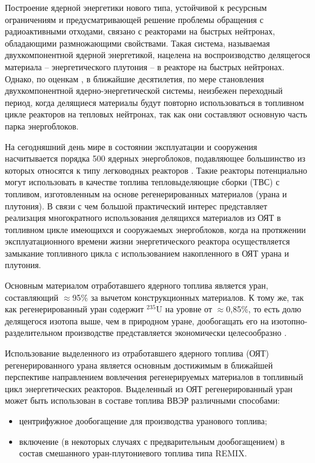 {\actuality}
Построение ядерной энергетики нового типа, устойчивой к ресурсным ограничениям и предусматривающей решение проблемы обращения с радиоактивными отходами, связано с реакторами на быстрых нейтронах, обладающими размножающими свойствами. Такая система, называемая двухкомпонентной ядерной энергетикой, нацелена на воспроизводство делящегося материала -- энергетического  плутония -- в реакторе на быстрых нейтронах. Однако, по оценкам \cite{andrianovaPerspektivnyeToplivnyeZagruzki2015}, в ближайшие десятилетия, по мере становления двухкомпонентной ядерно-энергетической системы, неизбежен переходный период, когда делящиеся материалы будут повторно использоваться в топливном цикле реакторов на тепловых нейтронах, так как они составляют основную часть парка энергоблоков.

На сегодняшний день мире в состоянии эксплуатации и сооружения насчитывается порядка 500 ядерных энергоблоков, подавляющее большинство из которых относятся к типу легководных реакторов \cite{PRISHome}. Такие реакторы потенциально могут использовать в качестве топлива тепловыделяющие сборки (ТВС) с топливом, изготовленным на основе регенерированных материалов (урана и плутония). В связи с чем большой практический интерес представляет реализация многократного использования делящихся материалов из ОЯТ в топливном цикле имеющихся и сооружаемых энергоблоков, когда на протяжении эксплуатационного времени жизни энергетического реактора осуществляется замыкание топливного цикла с использованием накопленного в ОЯТ урана и плутония.

Основным материалом отработавшего ядерного топлива является уран, составляющий $\approx$95\% за вычетом конструкционных материалов. К тому же, так как регенерированный уран содержит $^{235}$U на уровне от $\approx$0,85\%, то есть долю делящегося изотопа выше, чем в природном уране, дообогащать его на изотопно-разделительном производстве представляется экономически целесообразно \cite{NikipelovNikipelovSudby}.

Использование выделенного из отработавшего ядерного топлива (ОЯТ) регенерированного урана является основным достижимым в ближайшей перспективе направлением вовлечения регенерируемых материалов в топливный цикл энергетических реакторов. Выделенный из ОЯТ регенерированный уран может быть использован в составе топлива ВВЭР различными способами:
\begin{itemize}
  \item центрифужное дообогащение для производства уранового топлива;
  \item включение (в некоторых случаях с предварительным дообогащением) в состав смешанного уран-плутониевого топлива типа REMIX.
\end{itemize}
 
